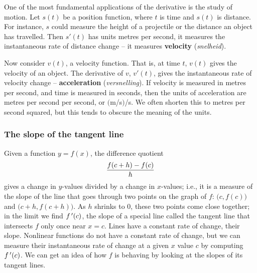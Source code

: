 One of the most fundamental applications of the derivative is the study of motion. Let $s(t)$ be a position function, where $t$ is time and $s(t)$ is  distance. For instance, $s$ could measure the height of a projectile or the distance an object has travelled. Then $s'(t)$ has units metres per second, it measures the instantaneous rate of distance change -- it measures \textbf{velocity} (\textit{snelheid}). 

Now consider $v(t)$, a velocity function. That is, at time $t$, $v(t)$ gives the velocity of an object. The derivative of $v$, $v'(t)$, gives the instantaneous rate of velocity change -- \textbf{acceleration} (\textit{versnelling}).  If velocity is measured in metres per second, and time is measured in seconds, then the units of acceleration  are metres per second per second, or $($m/s$)$/s. We often shorten this to metres per second squared,  but this tends to obscure the meaning of the units.




\subsubsection{The slope of the tangent line}

Given a function $y=f(x)$, the difference quotient 
$$\displaystyle \frac{f(c+h)-f(c)}{h}$$
 gives a change in $y$-values divided by a change in $x$-values; i.e., it is a measure of the slope of the line that goes through two points on the graph of $f$: $\big(c, f(c)\big)$ and $\big(c+h,f(c+h)\big)$. As $h$ shrinks to 0, these two points come close together; in the limit we find $f\,'(c)$, the slope of a special line called the tangent line that intersects $f$ only once near $x=c$. Lines have a constant rate of change, their slope. Nonlinear functions do not have a constant rate of change, but we can measure their instantaneous rate of change at a given $x$ value $c$ by computing $f\,'(c)$. We can get an idea of how $f$ is behaving by looking at the slopes of its tangent lines. 





